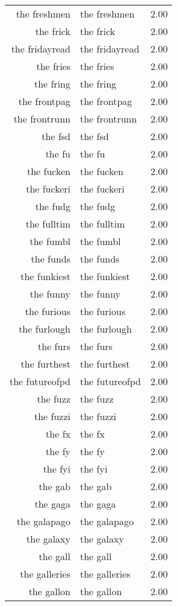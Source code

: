 \begin{table}[ht]
\begin{tabular}{rlr}
  the freshmen & the freshmen & 2.00 \\ 
  the frick & the frick & 2.00 \\ 
  the fridayread & the fridayread & 2.00 \\ 
  the fries & the fries & 2.00 \\ 
  the fring & the fring & 2.00 \\ 
  the frontpag & the frontpag & 2.00 \\ 
  the frontrunn & the frontrunn & 2.00 \\ 
  the fsd & the fsd & 2.00 \\ 
  the fu & the fu & 2.00 \\ 
  the fucken & the fucken & 2.00 \\ 
  the fuckeri & the fuckeri & 2.00 \\ 
  the fudg & the fudg & 2.00 \\ 
  the fulltim & the fulltim & 2.00 \\ 
  the fumbl & the fumbl & 2.00 \\ 
  the funds & the funds & 2.00 \\ 
  the funkiest & the funkiest & 2.00 \\ 
  the funny & the funny & 2.00 \\ 
  the furious & the furious & 2.00 \\ 
  the furlough & the furlough & 2.00 \\ 
  the furs & the furs & 2.00 \\ 
  the furthest & the furthest & 2.00 \\ 
  the futureofpd & the futureofpd & 2.00 \\ 
  the fuzz & the fuzz & 2.00 \\ 
  the fuzzi & the fuzzi & 2.00 \\ 
  the fx & the fx & 2.00 \\ 
  the fy & the fy & 2.00 \\ 
  the fyi & the fyi & 2.00 \\ 
  the gab & the gab & 2.00 \\ 
  the gaga & the gaga & 2.00 \\ 
  the galapago & the galapago & 2.00 \\ 
  the galaxy & the galaxy & 2.00 \\ 
  the gall & the gall & 2.00 \\ 
  the galleries & the galleries & 2.00 \\ 
  the gallon & the gallon & 2.00 \\ 

\end{tabular}
\end{table}
